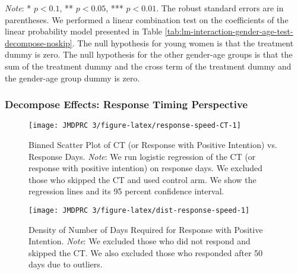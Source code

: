 \documentclass[12pt, a4paper]{article}
\begin{document}
\begin{table}[H]
\begin{threeparttable}
\begin{tabular}[t]{llcccccc}
\bottomrule
\end{tabular}
\begin{tablenotes}
\item \emph{Note}: * $p < 0.1$, ** $p < 0.05$, *** $p < 0.01$. The robust standard errors are in parentheses. We performed a linear combination test on the coefficients of the linear probability model presented in Table \ref{tab:lm-interaction-gender-age-test-decompose-noskip}. The null hypothesis for young women is that the treatment dummy is zero. The null hypothesis for the other gender-age groups is that the sum of the treatment dummy and the cross term of the treatment dummy and the gender-age group dummy is zero.
\end{tablenotes}
\end{threeparttable}
\end{table}

\hypertarget{decompose-effects-response-timing-perspective}{%
\subsubsection{Decompose Effects: Response Timing Perspective}\label{decompose-effects-response-timing-perspective}}

\begin{figure}[H]
\texttt{[image: JMDPRC~3/figure-latex/response-speed-CT-1]} \caption{Binned Scatter Plot of CT (or Response with Positive Intention) vs. Response Days. \newline \emph{Note}: We run logistic regression of the CT (or response with positive intention) on response days. We excluded those who skipped the CT and used control arm. We show the regression lines and its 95 percent confidence interval.}\label{fig:response-speed-CT}
\end{figure}

\begin{figure}[t]
\texttt{[image: JMDPRC~3/figure-latex/dist-response-speed-1]} \caption{Density of Number of Days Required for Response with Positive Intention. \newline \emph{Note}: We excluded those who did not respond and skipped the CT. We also excluded those who responded after 50 days due to outliers.}\label{fig:dist-response-speed}
\end{figure}
\end{document}
